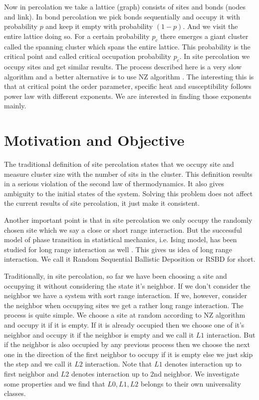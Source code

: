 	 Now in percolation we take a lattice (graph) consists of sites and bonds (nodes and link). In bond percolation we pick bonds sequentially and occupy it with probability $p$ and keep it empty with probability $(1-p)$. And we visit the entire lattice doing so. For a certain probability $p_c$ there emerges a giant cluster called the spanning cluster which spans the entire lattice. This probability is the critical point and called critical occupation probability $p_c$. In site percolation we occupy sites and get similar results. The process described here is a very slow algorithm and a better alternative is to use NZ algorithm \cite{Newman2000, Newman2001}. The interesting this is that at critical point the order parameter, specific heat and susceptibility follows power law with different exponents. We are interested in finding those exponents mainly.
	 
	 



\section{Motivation and Objective} 
	The traditional definition of site percolation states that we occupy site and measure cluster size with the number of sits in the cluster. This definition results in a serious violation of the second law of thermodynamics. It also gives ambiguity to the initial states of the system. Solving this problem does not affect the current results of site percolation, it just make it consistent.
	
	Another important point is that in site percolation we only occupy the randomly chosen site which we say a close or short range interaction. But the successful model of phase transition in statistical mechanics, i.e. Ising model, has been studied for long range interaction as well \cite{Hiley1965, Cannas1995}. This gives us idea of long range interaction. We call it Random Sequential Ballistic Deposition or RSBD for short.
	
	Traditionally, in site percolation, so far we have been choosing a site and occupying it without considering the state it's neighbor. If we don't consider the neighbor we have a system with sort range interaction. If we, however, consider the neighbor when occupying sites we get a rather long range interaction. The process is quite simple. We choose a site at random according to NZ algorithm and occupy it if it is empty. If it is already occupied then we choose one of it's neighbor and occupy it if the neighbor is empty and we call it $L1$ interaction. But if the neighbor is also occupied by any previous process then we choose the next one in the direction of the first neighbor to occupy if it is empty else we just skip the step and we call it $L2$ interaction. Note that $L1$ denotes interaction up to first neighbor and $L2$ denotes interaction up to 2nd neighbor.  We investigate some properties and we find that $L0, L1, L2$ belongs to their own universality classes.
	

